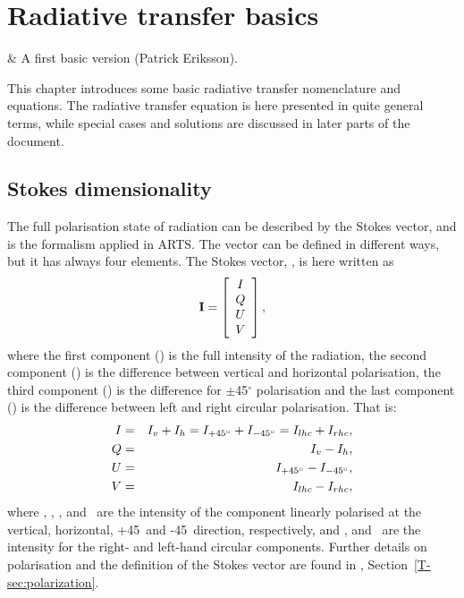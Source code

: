 \chapter{Radiative transfer basics}
 \label{sec:rte_basics}

 & A first basic version (Patrick Eriksson).\\
\stophistory

This chapter introduces some basic radiative transfer nomenclature and
equations. The radiative transfer equation is here presented in quite general
terms, while special cases and solutions are discussed in later parts of the
document.



\section{Stokes dimensionality}
\label{sec:fm_defs:polarisation}

The full polarisation state of radiation can be described by the Stokes vector,
and is the formalism applied in ARTS. The vector can be defined in different
ways, but it has always four elements. The Stokes vector, \StoVec, is here
written as
\begin{equation}
  \label{eq:fm_defs:stokevec}
  {\bf I} = \left[
  \begin{array}{c}
   I\\ Q \\ U\\ V
  \end{array}
  \right],
\end{equation}
where the first component (\StoI) is the full intensity of the
radiation, the second component (\StoQ) is the difference between
vertical and horizontal polarisation, the third component (\StoU) is the
difference for $\pm$45$^\circ$ polarisation and the last component
(\StoV) is the difference between left and right circular polarisation.
That is:
\begin{eqnarray}
  I &=&   I_v + I_h = I_{+45^\circ} + I_{-45^\circ} = I_{lhc} + I_{rhc}, \\
  Q &=&   I_v - I_h,                                 \\
  U &=&   I_{+45^\circ} - I_{-45^\circ},                             \\
  V &=&   I_{lhc} - I_{rhc},                             
\end{eqnarray}
where \Iv, \Ih, \Ipff, and \Imff\ are the intensity of the component linearly
polarised at the vertical, horizontal, +45\degree\ and -45\degree\ direction,
respectively, and \Irhc, and \Ilhc\ are the intensity for the right- and
left-hand circular components. Further details on polarisation and the
definition of the Stokes vector are found in \theory,
Section~\ref{T-sec:polarization}.

